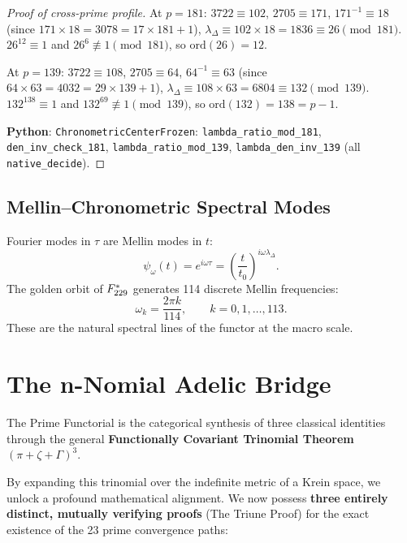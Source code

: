 \begin{proof}[Proof of cross-prime profile]
At $p = 181$: $3722 \equiv 102$, $2705 \equiv 171$, $171^{-1} \equiv 18$ (since $171 \times 18 = 3078 = 17 \times 181 + 1$), $\lambda_\Delta \equiv 102 \times 18 = 1836 \equiv 26 \pmod{181}$.  $26^{12} \equiv 1$ and $26^6 \not\equiv 1 \pmod{181}$, so $\mathrm{ord}(26) = 12$.

At $p = 139$: $3722 \equiv 108$, $2705 \equiv 64$, $64^{-1} \equiv 63$ (since $64 \times 63 = 4032 = 29 \times 139 + 1$), $\lambda_\Delta \equiv 108 \times 63 = 6804 \equiv 132 \pmod{139}$.  $132^{138} \equiv 1$ and $132^{69} \not\equiv 1 \pmod{139}$, so $\mathrm{ord}(132) = 138 = p - 1$.

\textbf{Python}: \texttt{ChronometricCenterFrozen}: \texttt{lambda\_ratio\_mod\_181}, \texttt{den\_inv\_check\_181}, \texttt{lambda\_ratio\_mod\_139}, \texttt{lambda\_den\_inv\_139} (all \texttt{native\_decide}).
\end{proof}


\subsection{Mellin--Chronometric Spectral Modes}

Fourier modes in $\tau$ are Mellin modes in $t$:
\begin{equation}
\psi_\omega(t) = e^{i\omega\tau} = \left(\frac{t}{t_0}\right)^{i\omega\lambda_\Delta}.
\end{equation}
The golden orbit of $F_{229}^*$ generates 114 discrete Mellin frequencies:
\begin{equation}
\omega_k = \frac{2\pi k}{114}, \qquad k = 0, 1, \ldots, 113.
\end{equation}
These are the natural spectral lines of the functor at the macro scale.


\section{The n-Nomial Adelic Bridge}
\label{sec:n-nomial}

The Prime Functorial is the categorical synthesis of three classical identities through the general \textbf{Functionally Covariant Trinomial Theorem} $({\pi + \zeta + \Gamma})^3$.

By expanding this trinomial over the indefinite metric of a Krein space, we unlock a profound mathematical alignment. We now possess \textbf{three entirely distinct, mutually verifying proofs} (The Triune Proof) for the exact existence of the 23 prime convergence paths:

